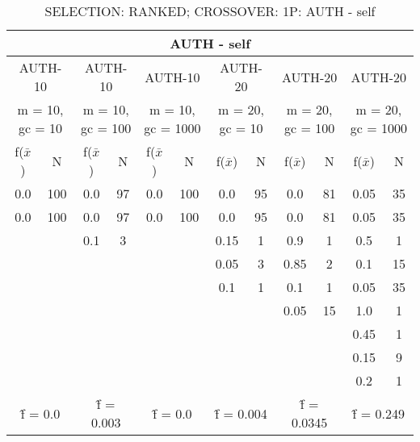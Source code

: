 \begin{table}[H]
	\centering
	\caption{SELECTION: RANKED; CROSSOVER: 1P: AUTH - self}
	\begin{adjustbox}{width=1\textwidth}
		\begin{tabular}{ |c|c||c|c||c|c||c|c||c|c||c|c| }
			\hline
			\multicolumn{12}{|c|}{AUTH - self} \\
			\hline
			\multicolumn{2}{|c||}{AUTH-10} & \multicolumn{2}{c||}{AUTH-10} & \multicolumn{2}{c||}{AUTH-10} & \multicolumn{2}{c||}{AUTH-20} & \multicolumn{2}{c||}{AUTH-20} & \multicolumn{2}{c|}{AUTH-20}\\
			\hline
			\multicolumn{2}{|c||}{m = 10, gc = 10} & \multicolumn{2}{c||}{m = 10, gc = 100} & \multicolumn{2}{c||}{m = 10, gc = 1000} & \multicolumn{2}{c||}{m = 20, gc = 10} & \multicolumn{2}{c||}{m = 20, gc = 100} & \multicolumn{2}{c|}{m = 20, gc = 1000}\\
			\hline
			f($\bar{x}$) & N & f($\bar{x}$) & N & f($\bar{x}$) & N & f($\bar{x}$) & N & f($\bar{x}$) & N & f($\bar{x}$) & N\\
			\hline
			\hline
			0.0 & 100 & 0.0 & 97 & 0.0 & 100 & 0.0 & 95 & 0.0 & 81 & 0.05 & 35\\
			\hline
			0.0 & 100 & 0.0 & 97 & 0.0 & 100 & 0.0 & 95 & 0.0 & 81 & 0.05 & 35\\
			&   & 0.1 & 3 &   &   & 0.15 & 1 & 0.9 & 1 & 0.5 & 1\\
			&   &   &   &   &   & 0.05 & 3 & 0.85 & 2 & 0.1 & 15\\
			&   &   &   &   &   & 0.1 & 1 & 0.1 & 1 & 0.05 & 35\\
			&   &   &   &   &   &   &   & 0.05 & 15 & 1.0 & 1\\
			&   &   &   &   &   &   &   &   &   & 0.45 & 1\\
			&   &   &   &   &   &   &   &   &   & 0.15 & 9\\
			&   &   &   &   &   &   &   &   &   & 0.2 & 1\\
			\hline
			\multicolumn{2}{|c||}{\^{f} = 0.0} & \multicolumn{2}{c||}{\^{f} = 0.003} & \multicolumn{2}{c||}{\^{f} = 0.0} & \multicolumn{2}{c||}{\^{f} = 0.004} & \multicolumn{2}{c||}{\^{f} = 0.0345} & \multicolumn{2}{c|}{\^{f} = 0.249}\\
			\hline
		\end{tabular}
	\end{adjustbox}
\end{table}
